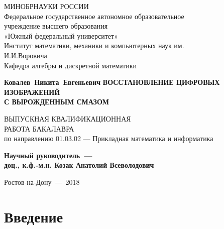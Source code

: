 \documentclass[a4paper]{article}
\renewcommand{\normalsize}{\fontsize{14}{16pt}\selectfont}
\renewcommand{\large}{\fontsize{17}{20pt}\selectfont}
\theoremstyle{definition}
\begin{document}
\normalsize

    \thispagestyle{empty}
    \begin{titlepage}
    \begin{center}


    \vfill
    МИНОБРНАУКИ РОССИИ\\
    \vspace*{0.3cm}
    Федеральное государственное автономное образовательное\\
    учреждение высшего образования\\
    «Южный федеральный университет»\\
    \vspace*{0.3cm}
    Институт математики, механики и компьютерных наук им.\\
    И.И.Воровича\\
    Кафедра алгебры и дискретной математики
    \vfill


    \bigskip


    {\large\bf Ковалев~Никита~Евгеньевич}
    \vfill
    {\large\bf ВОССТАНОВЛЕНИЕ ЦИФРОВЫХ ИЗОБРАЖЕНИЙ\\
               С ВЫРОЖДЕННЫМ СМАЗОМ}

\fontsize{14}{16pt}\selectfont

    \vfill
    ВЫПУСКНАЯ КВАЛИФИКАЦИОННАЯ\\ РАБОТА БАКАЛАВРА\\
    по направлению 01.03.02 — Прикладная математика и информатика
    \vfill

    {\bf Научный руководитель~---\\
         доц., к.ф.-м.н. Козак Анатолий Всеволодович}



    \vfill

    \end{center}

    \bigskip

    \begin{center}
        Ростов-на-Дону~---~2018
    \end{center}

    \end{titlepage}

    \tableofcontents
    \newpage


    \section*{Введение}
\end{document}
